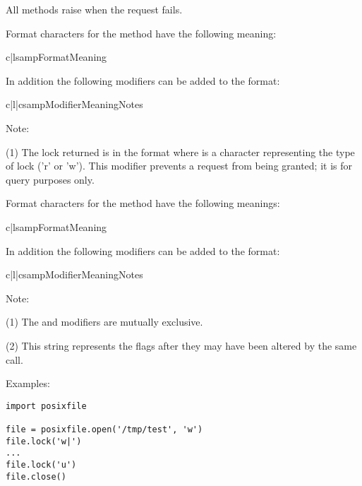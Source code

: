 All methods raise  when the request fails.

Format characters for the  method have the following
meaning:

\begin{tableii}{c|l}{samp}{Format}{Meaning}
\end{tableii}

In addition the following modifiers can be added to the format:

\begin{tableiii}{c|l|c}{samp}{Modifier}{Meaning}{Notes}
\end{tableiii}

Note:

(1) The lock returned is in the format  where  is a character
representing the type of lock ('r' or 'w').  This modifier prevents a
request from being granted; it is for query purposes only.

Format characters for the  method have the following
meanings:

\begin{tableii}{c|l}{samp}{Format}{Meaning}
\end{tableii}

In addition the following modifiers can be added to the format:

\begin{tableiii}{c|l|c}{samp}{Modifier}{Meaning}{Notes}
\end{tableiii}

Note:

(1) The \samp{!} and \samp{=} modifiers are mutually exclusive.

(2) This string represents the flags after they may have been altered
by the same call.

Examples:

\begin{verbatim}
import posixfile

file = posixfile.open('/tmp/test', 'w')
file.lock('w|')
...
file.lock('u')
file.close()
\end{verbatim}
